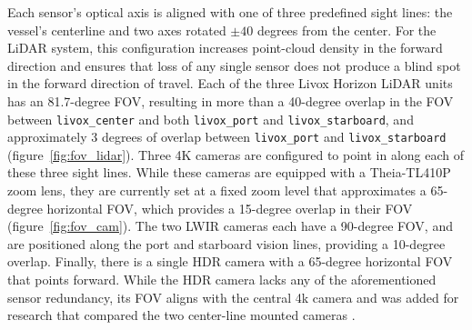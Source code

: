 \documentclass{erauthesis}
\begin{document}
Each sensor’s optical axis is aligned with one of three predefined sight lines: the vessel's centerline and two axes rotated $\pm 40$ degrees from the center.
For the LiDAR system, this configuration increases point-cloud density in the forward direction and ensures that loss of any single sensor does not produce a blind spot in the forward direction of travel.
Each of the three Livox Horizon LiDAR units has an 81.7-degree \ac{FOV}, resulting in more than a 40-degree overlap in the \ac{FOV} between \texttt{livox\_center} and both \texttt{livox\_port} and \texttt{livox\_starboard}, and approximately 3 degrees of overlap between \texttt{livox\_port} and \texttt{livox\_starboard} (figure~\ref{fig:fov_lidar}).
Three 4K cameras are configured to point in along each of these three sight lines. 
While these cameras are equipped with a Theia-TL410P zoom lens, they are currently set at a fixed zoom level that approximates a 65-degree horizontal \ac{FOV}, which provides a 15-degree overlap in their \ac{FOV} (figure~\ref{fig:fov_cam}).
The two \ac{LWIR} cameras each have a 90-degree \acs{FOV}, and are positioned along the port and starboard vision lines, providing a 10-degree overlap.
Finally, there is a single HDR camera with a 65-degree horizontal \ac{FOV} that points forward.
While the \ac{HDR} camera lacks any of the aforementioned sensor redundancy, its \ac{FOV} aligns with the central 4k camera and was added for research that compared the two center-line mounted cameras \cite{liebergall}.

\end{document}
